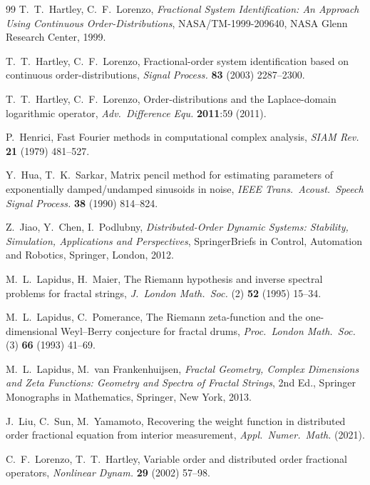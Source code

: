 \documentclass[11pt, a4paper]{article}
\theoremstyle{definition}
\theoremstyle{remark}
\begin{document}
\begin{thebibliography}{99}
 T.~T.~Hartley, C.~F.~Lorenzo, \emph{Fractional
System Identification: An Approach Using Continuous Order-Distributions},
NASA/TM-1999-209640, NASA Glenn Research Center, 1999.

 T.~T.~Hartley, C.~F.~Lorenzo, Fractional-order
system identification based on continuous order-distributions,
\emph{Signal Process.} \textbf{83} (2003) 2287--2300.

 T.~T.~Hartley, C.~F.~Lorenzo,
Order-distributions and the Laplace-domain logarithmic operator,
\emph{Adv.\ Difference Equ.} \textbf{2011}:59 (2011).

 P.~Henrici, Fast Fourier methods in computational
complex analysis, \emph{SIAM Rev.} \textbf{21} (1979) 481--527.

 Y.~Hua, T.~K.~Sarkar, Matrix pencil method for
estimating parameters of exponentially damped/undamped sinusoids in
noise, \emph{IEEE Trans.\ Acoust.\ Speech Signal Process.} \textbf{38}
(1990) 814--824.

 Z.~Jiao, Y.~Chen, I.~Podlubny,
\emph{Distributed-Order Dynamic Systems: Stability, Simulation,
Applications and Perspectives}, SpringerBriefs in Control, Automation and
Robotics, Springer, London, 2012.

 M.~L.~Lapidus, H.~Maier, The Riemann hypothesis
and inverse spectral problems for fractal strings, \emph{J.\ London Math.\
Soc.} (2) \textbf{52} (1995) 15--34.

 M.~L.~Lapidus, C.~Pomerance, The Riemann
zeta-function and the one-dimensional Weyl--Berry conjecture for fractal
drums, \emph{Proc.\ London Math.\ Soc.} (3) \textbf{66} (1993) 41--69.

 M.~L.~Lapidus, M.~van
Frankenhuijsen, \emph{Fractal Geometry, Complex Dimensions and Zeta
Functions: Geometry and Spectra of Fractal Strings}, 2nd Ed., Springer
Monographs in Mathematics, Springer, New York, 2013.

 J.~Liu, C.~Sun, M.~Yamamoto, Recovering the
weight function in distributed order fractional equation from interior
measurement, \emph{Appl.\ Numer.\ Math.} (2021).

 C.~F.~Lorenzo, T.~T.~Hartley, Variable order
and distributed order fractional operators, \emph{Nonlinear Dynam.}
\textbf{29} (2002) 57--98.


\end{thebibliography}
\end{document}
